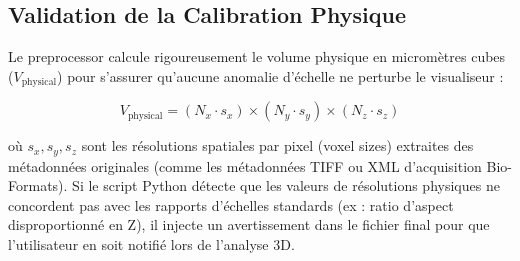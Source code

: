 \subsection{Validation de la Calibration Physique}
Le preprocessor calcule rigoureusement le volume physique en micromètres cubes ($V_{\text{physical}}$) pour s'assurer qu'aucune anomalie d'échelle ne perturbe le visualiseur :

\begin{equation}
    V_{\text{physical}} = (N_x \cdot s_x) \times (N_y \cdot s_y) \times (N_z \cdot s_z)
\end{equation}

où $s_x, s_y, s_z$ sont les résolutions spatiales par pixel (voxel sizes) extraites des métadonnées originales (comme les métadonnées TIFF ou XML d'acquisition Bio-Formats). Si le script Python détecte que les valeurs de résolutions physiques ne concordent pas avec les rapports d'échelles standards (ex : ratio d'aspect disproportionné en Z), il injecte un avertissement dans le fichier final pour que l'utilisateur en soit notifié lors de l'analyse 3D.
